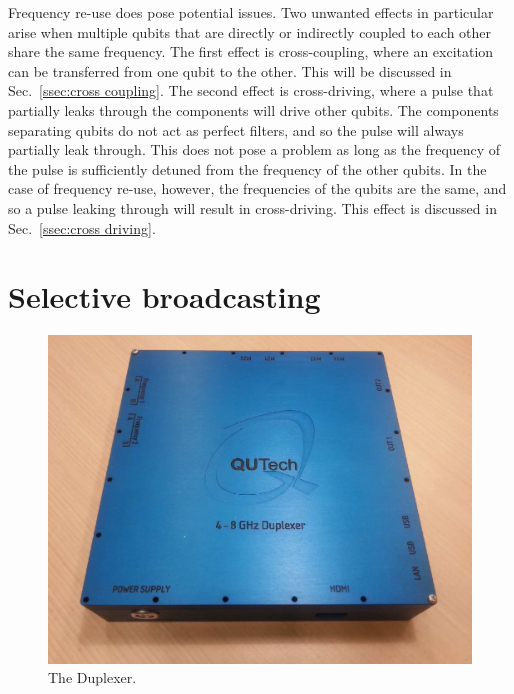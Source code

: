       Frequency re-use does pose potential issues. Two unwanted effects in particular arise when multiple qubits that are directly or indirectly coupled to each other share the same frequency. The first effect is cross-coupling, where an excitation can be transferred from one qubit to the other. This will be discussed in Sec.~\ref{ssec:cross coupling}. The second effect is cross-driving, where a pulse that partially leaks through the components will drive other qubits. The components separating qubits do not act as perfect filters, and so the pulse will always partially leak through. This does not pose a problem as long as the frequency of the pulse is sufficiently detuned from the frequency of the other qubits. In the case of frequency re-use, however, the frequencies of the qubits are the same, and so a pulse leaking through will result in cross-driving. This effect is discussed in Sec.~\ref{ssec:cross driving}.

    \section{Selective broadcasting}
      \label{sec:selective broadcasting using the Duplexer}
      \begin{figure}
        \begin{center}
        \vspace{-30pt}
          \includegraphics[width=\textwidth]{Figures/Duplexer_with_background.png}
        \end{center}
        \vspace{-5pt}
        \caption{The Duplexer.}
        \label{fig:Duplexer picture}
        \vspace{-10pt}
      \end{figure}

